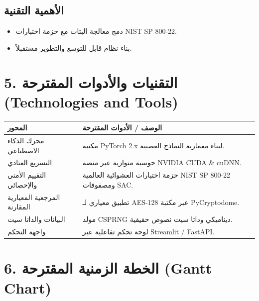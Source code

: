 \documentclass[12pt,a4paper]{article}
\begin{document}
\subsection*{\color{navyblue}الأهمية التقنية}
\begin{itemize}
\item دمج معالجة البتات مع حزمة اختبارات NIST SP 800-22.
\item بناء نظام قابل للتوسع والتطوير مستقبلاً.
\end{itemize}

\section*{5. التقنيات والأدوات المقترحة (Technologies and Tools)}
\begin{tabularx}{\textwidth}{|l|X|}
\hline
\rowcolor{navyblue} \color{white}\textbf{المحور} & \color{white}\textbf{الوصف / الأدوات المقترحة} \\
\hline
محرك الذكاء الاصطناعي & مكتبة PyTorch 2.x لبناء معمارية النماذج العصبية. \\
\hline
التسريع العتادي & حوسبة متوازية عبر منصة NVIDIA CUDA \& cuDNN. \\
\hline
التقييم الأمني والإحصائي & حزمة اختبارات العشوائية العالمية NIST SP 800-22 ومصفوفات SAC. \\
\hline
المرجعية المعيارية المقارنة & تطبيق معياري لـ AES-128 عبر مكتبة PyCryptodome. \\
\hline
البيانات والداتا سيت & مولد CSPRNG ديناميكي وداتا سيت نصوص حقيقية. \\
\hline
واجهة التحكم & لوحة تحكم تفاعلية عبر Streamlit / FastAPI. \\
\hline
\end{tabularx}

\section*{6. الخطة الزمنية المقترحة (Gantt Chart)}

\newpage

\end{document}
